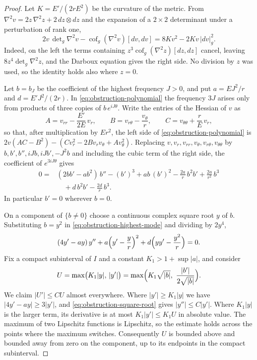 \begin{proof}
Let $K=E'/(2rE^2)$ be the curvature of the metric. From
$\nabla^2v=2z\,\nabla^2z+2\,dz\otimes dz$ and the expansion of a
$2\times2$ determinant under a perturbation of rank one,
\begin{equation}\label{eq:obstruction-polynomial}
 2v\,\det\nolimits_g\nabla^2v
 -\operatorname{cof}_g(\nabla^2v)[dv,dv]
       =8Kv^2-2Kv\,|dv|_g^2 .
\end{equation}
Indeed, on the left the terms containing
$z^3\operatorname{cof}_g(\nabla^2z)[dz,dz]$ cancel, leaving
$8z^4\det_g\nabla^2z$, and the Darboux equation gives the right side.
No division by $z$ was used, so the identity holds also where $z=0$.

Let $b=b_J$ be the coefficient of the highest frequency $J>0$, and put
$a=EJ^2/r$ and $d=E'J^2/(2r)$. In \eqref{eq:obstruction-polynomial}
the frequency $3J$ arises only from products of three copies of
$b\,e^{iJ\theta}$. Write the entries of the Hessian of $v$ as
\[
 A=v_{rr}-\frac{E'}{2E}\,v_r,\qquad
 B=v_{r\theta}-\frac{v_\theta}r,\qquad
 C=v_{\theta\theta}+\frac rE\,v_r ,
\]
so that, after multiplication by $Er^2$, the left side of
\eqref{eq:obstruction-polynomial} is
$2v(AC-B^2)-(Cv_r^2-2Bv_rv_\theta+Av_\theta^2)$. Replacing
$v,v_r,v_{rr},v_\theta,v_{r\theta},v_{\theta\theta}$ by
$b,b',b'',iJb,iJb',-J^2b$ and including the cubic term of the right
side, the coefficient of $e^{3iJ\theta}$ gives
\begin{equation}\label{eq:obstruction-highest-mode}
\begin{split}
0={}&(2bb'-ab^2)\,b''-(b')^3+ab\,(b')^2
 -\frac{2a}{r}\,b^2b'+\frac{2a}{r^2}\,b^3\\
 &\quad+d\,b^2b'-\frac{2d}{r}\,b^3 .
\end{split}
\end{equation}
In particular $b'=0$ wherever $b=0$.

On a component of $\{b\ne0\}$ choose a continuous complex square root
$y$ of $b$. Substituting $b=y^2$ in
\eqref{eq:obstruction-highest-mode} and dividing by $2y^4$,
\begin{equation}\label{eq:obstruction-square-root}
 (4y'-ay)\,y''+a\Bigl(y'-\frac yr\Bigr)^2
 +d\Bigl(yy'-\frac{y^2}r\Bigr)=0 .
\end{equation}
Fix a compact subinterval of $I$ and a constant $K_1>1+\sup|a|$, and
consider
\[
 U=\max\bigl(K_1|y|,\,|y'|\bigr)
   =\max\Bigl(K_1\sqrt{|b|},\ \frac{|b'|}{2\sqrt{|b|}}\Bigr).
\]
We claim $|U'|\le CU$ almost everywhere. Where $|y'|\ge K_1|y|$ we
have $|4y'-ay|\ge3|y'|$, and \eqref{eq:obstruction-square-root} gives
$|y''|\le C|y'|$. Where $K_1|y|$ is the larger term, its derivative is
at most $K_1|y'|\le K_1U$ in absolute value. The maximum of two
Lipschitz functions is Lipschitz, so the estimate holds across the
points where the maximum switches. Consequently $U$ is bounded above
and bounded away from zero on the component, up to its endpoints in
the compact subinterval.


\end{proof}

